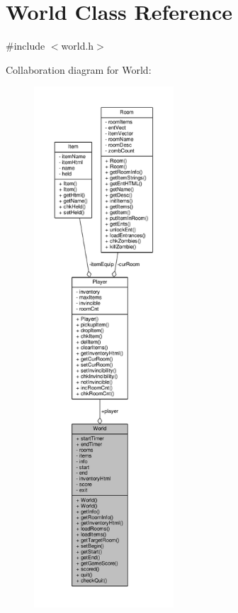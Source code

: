 \hypertarget{class_world}{}\section{World Class Reference}
\label{class_world}


{\ttfamily \#include $<$world.\+h$>$}



Collaboration diagram for World\+:
\nopagebreak
\begin{figure}[H]
\begin{center}
\leavevmode
\includegraphics[height=550pt]{class_world__coll__graph}
\end{center}
\end{figure}
